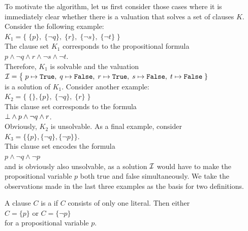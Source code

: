 To motivate the algorithm, let us first consider those cases where
it is immediately clear whether there is a valuation that solves a set of clauses $K$.
Consider the following example: \\[0.2cm]
\hspace*{1.3cm} 
$K_1 = \bigl\{\; \{p\},\; \{\neg q\},\; \{r\},\; \{\neg s\}, \; \{\neg t\} \;\bigr\}$ 
\\[0.2cm]
The clause set $K_1$ corresponds to the propositional formula
\\[0.2cm]
\hspace*{1.3cm}
$p \wedge \neg q \wedge r \wedge \neg s \wedge \neg t$.
\\[0.2cm]
Therefore, $K_1$ is solvable and the valuation  \\[0.2cm]
\hspace*{1.3cm} 
$\mathcal{I} = \bigl\{\; p \mapsto \texttt{True},\; q \mapsto \texttt{False},\; r \mapsto \texttt{True},\; s \mapsto
\texttt{False},\; t \mapsto \texttt{False}\;\}$
\\[0.2cm]
is a solution of $K_1$. Consider another example: \\[0.2cm]
\hspace*{1.3cm} 
$K_2 = \bigl\{\; \{\}, \{p\},\; \{\neg q\},\; \{r\}\; \bigr\}$ 
\\[0.2cm]
This clause set corresponds to the formula
\\[0.2cm]
\hspace*{1.3cm}
$\bot \wedge p \wedge \neg q \wedge r$.
\\[0.2cm]
Obviously, $K_2$ is unsolvable. As a final example, consider
\\[0.2cm]
\hspace*{1.3cm} $K_3 = \bigl\{ \{p\}, \{\neg q\}, \{\neg p\} \bigr\}$.
\\[0.2cm]
This clause set encodes the formula
\\[0.2cm]
\hspace*{1.3cm}
$p \wedge \neg q \wedge \neg p $
\\[0.2cm]
and is obviously also unsolvable, as a solution $\mathcal{I}$ would have to make the propositional variable $p$ both
true and false simultaneously. We take the observations made in the last three examples as the basis for two
definitions.

\begin{Definition}
  A clause $C$ is a  if $C$ consists of only one literal.
  Then either
  \\[0.2cm]
  \hspace*{1.3cm}
  $C = \{p\}$ \quad or \quad $C = \{\neg p\}$ 
  \\[0.2cm]
  for a propositional variable $p$. \eox
\end{Definition}

